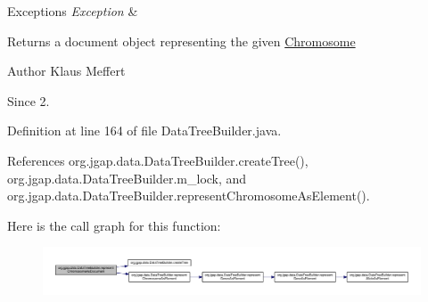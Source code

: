 \begin{DoxyExceptions}{Exceptions}
{\em Exception} & \\
\hline
\end{DoxyExceptions}
\begin{DoxyReturn}{Returns}
a document object representing the given \hyperlink{classorg_1_1jgap_1_1_chromosome}{Chromosome}
\end{DoxyReturn}
\begin{DoxyAuthor}{Author}
Klaus Meffert 
\end{DoxyAuthor}
\begin{DoxySince}{Since}
2. 
\end{DoxySince}


Definition at line 164 of file Data\-Tree\-Builder.\-java.



References org.\-jgap.\-data.\-Data\-Tree\-Builder.\-create\-Tree(), org.\-jgap.\-data.\-Data\-Tree\-Builder.\-m\-\_\-lock, and org.\-jgap.\-data.\-Data\-Tree\-Builder.\-represent\-Chromosome\-As\-Element().



Here is the call graph for this function\-:
\nopagebreak
\begin{figure}[H]
\begin{center}
\leavevmode
\includegraphics[width=350pt]{classorg_1_1jgap_1_1data_1_1_data_tree_builder_a4828f930beaffc5097a363320b6b9d35_cgraph}
\end{center}
\end{figure}



